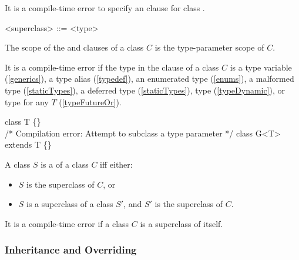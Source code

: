 \documentclass[makeidx]{article}
\begin{document}
\LMHash{}%
It is a compile-time error to specify an \EXTENDS{} clause
for class .

\begin{grammar}
<superclass> ::= \EXTENDS{} <type>
\end{grammar}


\LMHash{}%
The scope of the \EXTENDS{} and \WITH{} clauses of a class $C$ is the type-parameter scope of $C$.

\LMHash{}%
It is a compile-time error if the type in the \EXTENDS{} clause of a class $C$ is
a type variable (\ref{generics}), a type alias (\ref{typedef}),
an enumerated type (\ref{enums}), a malformed type (\ref{staticTypes}),
a deferred type (\ref{staticTypes}), type \DYNAMIC{} (\ref{typeDynamic}),
or type  for any $T$ (\ref{typeFutureOr}).


\begin{dartCode}
class T \{\}
\\
/* Compilation error: Attempt to subclass a type parameter */
class G<T> extends T \{\}
\end{dartCode}

\LMHash{}%
A class $S$ is a  of a class $C$ if{}f either:
\begin{itemize}
\item $S$ is the superclass of $C$, or
\item $S$ is a superclass of a class $S'$,
and $S'$ is the superclass of $C$.
\end{itemize}

\LMHash{}%
It is a compile-time error if a class $C$ is a superclass of itself.


\subsubsection{Inheritance and Overriding}
\end{document}
